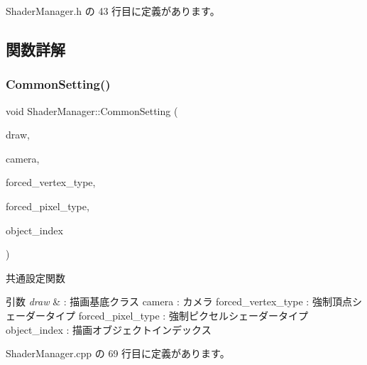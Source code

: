 Shader\+Manager.\+h の 43 行目に定義があります。



\subsection{関数詳解}
\mbox{\label{class_shader_manager_a6cfff8f4aee59d9bc5162a5a6f4d07d4}} 
\subsubsection{\texorpdfstring{Common\+Setting()}{CommonSetting()}}
{\footnotesize\ttfamily void Shader\+Manager\+::\+Common\+Setting (\begin{DoxyParamCaption}\item[{\mbox{\hyperlink{class_draw_base}{Draw\+Base}} $\ast$}]{draw,  }\item[{\mbox{\hyperlink{class_camera}{Camera}} $\ast$}]{camera,  }\item[{\mbox{\hyperlink{class_shader_manager_a9b51e49d70eb3cc58f6d1f3994e8cfbd}{Vertex\+Shader\+Type}}}]{forced\+\_\+vertex\+\_\+type,  }\item[{\mbox{\hyperlink{class_shader_manager_a7d15d773b3c6a99dd7086c45c8b0be5f}{Pixel\+Shader\+Type}}}]{forced\+\_\+pixel\+\_\+type,  }\item[{unsigned}]{object\+\_\+index }\end{DoxyParamCaption})}



共通設定関数 


\begin{DoxyParams}{引数}
{\em draw} & \+: 描画基底クラス camera \+: カメラ forced\+\_\+vertex\+\_\+type \+: 強制頂点シェーダータイプ forced\+\_\+pixel\+\_\+type \+: 強制ピクセルシェーダータイプ object\+\_\+index \+: 描画オブジェクトインデックス \\
\hline
\end{DoxyParams}


 Shader\+Manager.\+cpp の 69 行目に定義があります。

\mbox{\label{class_shader_manager_ad2b591958e1d22d746e5ed3d7941e4c1}} 
